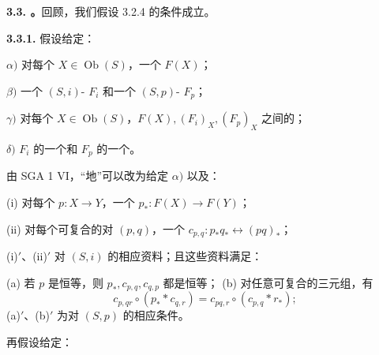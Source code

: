\textbf{3.3. 。}回顾，我们假设 3.2.4 的条件成立。

\textbf{3.3.1.} 假设给定：

$\alpha)$ 对每个 $X\in\operatorname{Ob}(S)$，一个 $F(X)$；

$\beta)$ 一个 $(S,i)$- $F_i$ 和一个 $(S,p)$- $F_p$；

$\gamma)$ 对每个 $X\in\operatorname{Ob}(S)$，$F(X),(F_i)_X,(F_p)_X$ 之间的；

$\delta)$ $F_i$ 的一个和 $F_p$ 的一个。

由 SGA 1 VI，“地”可以改为给定 $\alpha)$ 以及：

(i) 对每个 $p:X\to Y$，一个 $p_*:F(X)\to F(Y)$；

(ii) 对每个可复合的对 $(p,q)$，一个 $c_{p,q}:p_*q_*\leftrightarrow(pq)_*$；

(i)$'$、(ii)$'$ 对 $(S,i)$ 的相应资料；且这些资料满足：

(a) 若 $p$ 是恒等，则 $p_*,c_{p,q},c_{q,p}$ 都是恒等；
(b) 对任意可复合的三元组，有
\[c_{p,qr}\circ(p_* *c_{q,r})=c_{pq,r}\circ(c_{p,q}*r_*);\]
(a)$'$、(b)$'$ 为对 $(S,p)$ 的相应条件。

再假设给定：

